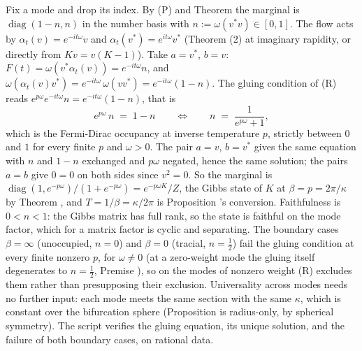 Fix a mode and drop its index. By (P) and Theorem  the marginal is $\operatorname{diag}(1 - n, n)$ in the number basis with $n := \omega(v^{*}v) \in [0,1]$. The flow acts by $\alpha_t(v) = e^{-it\omega}v$ and $\alpha_t(v^{*}) = e^{it\omega}v^{*}$ (Theorem (2) at imaginary rapidity, or directly from $Kv = v(K - 1)$). Take $a = v^{*}$, $b = v$: $F(t) = \omega(v^{*}\alpha_t(v)) = e^{-it\omega}n$, and $\omega(\alpha_t(v)v^{*}) = e^{-it\omega}\,\omega(vv^{*}) = e^{-it\omega}(1 - n)$. The gluing condition of (R) reads $e^{p\omega}e^{-it\omega}n = e^{-it\omega}(1 - n)$, that is
\[
e^{p\omega}\,n \;=\; 1 - n \qquad\Longleftrightarrow\qquad n \;=\; \frac{1}{e^{p\omega} + 1} ,
\]
which is the Fermi-Dirac occupancy at inverse temperature $p$, strictly between $0$ and $1$ for every finite $p$ and $\omega > 0$. The pair $a = v$, $b = v^{*}$ gives the same equation with $n$ and $1 - n$ exchanged and $p\omega$ negated, hence the same solution; the pairs $a = b$ give $0 = 0$ on both sides since $v^{2} = 0$. So the marginal is $\operatorname{diag}(1, e^{-p\omega})/(1 + e^{-p\omega}) = e^{-p\omega K}/Z$, the Gibbs state of $K$ at $\beta = p = 2\pi/\kappa$ by Theorem , and $T = 1/\beta = \kappa/2\pi$ is Proposition 's conversion. Faithfulness is $0 < n < 1$: the Gibbs matrix has full rank, so the state is faithful on the mode factor, which for a matrix factor is cyclic and separating. The boundary cases $\beta = \infty$ (unoccupied, $n = 0$) and $\beta = 0$ (tracial, $n = \tfrac12$) fail the gluing condition at every finite nonzero $p$, for $\omega \neq 0$ (at a zero-weight mode the gluing itself degenerates to $n = \tfrac12$, Premise ), so on the modes of nonzero weight (R) excludes them rather than presupposing their exclusion. Universality across modes needs no further input: each mode meets the same section with the same $\kappa$, which is constant over the bifurcation sphere (Proposition  is radius-only, by spherical symmetry). The script verifies the gluing equation, its unique solution, and the failure of both boundary cases, on rational data.
